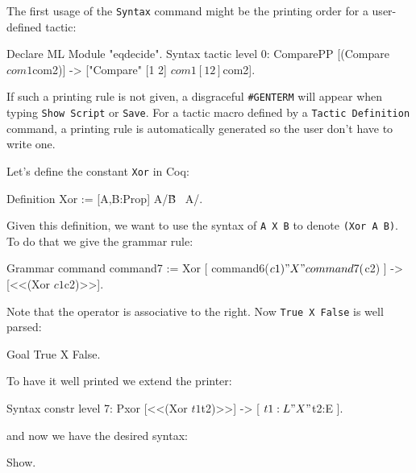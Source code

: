 \firstexample


The first usage of the \texttt{Syntax} command might be the printing
order for a user-defined tactic: 

\begin{coq_example*}
Declare ML Module "eqdecide".
Syntax tactic level 0:
  ComparePP [(Compare $com1 $com2)]    -> 
            ["Compare" [1 2] $com1 [1 2] $com2].
\end{coq_example*}

If such a printing rule is not given, a disgraceful \verb+#GENTERM+
will appear when typing \texttt{Show Script} or \texttt{Save}. For
a tactic macro defined by a \texttt{Tactic Definition} command, a
printing rule is automatically generated so the user don't have to
write one.


Let's define the constant \verb+Xor+ in Coq:

\begin{coq_example*}
Definition Xor := [A,B:Prop] A/\~B \/ ~A/\B.
\end{coq_example*}

Given this definition, we want to use the syntax of \verb+A X B+
to denote \verb+(Xor A B)+. To do that we give the grammar rule:

\begin{coq_example}
Grammar command  command7 :=
  Xor [ command6($c1) "X" command7($c2) ] -> [<<(Xor $c1 $c2)>>].
\end{coq_example}

Note that the operator is associative to the right.  
Now \verb+True X False+ is well parsed:

\begin{coq_example}
Goal True X False.
\end{coq_example}

To have it well printed we extend the printer:

\begin{coq_example}
Syntax constr level 7:
  Pxor  [<<(Xor  $t1  $t2)>>] -> [ $t1:L  " X "  $t2:E ].
\end{coq_example}

and now we have the desired syntax:

\begin{coq_example}
Show.
\end{coq_example}

